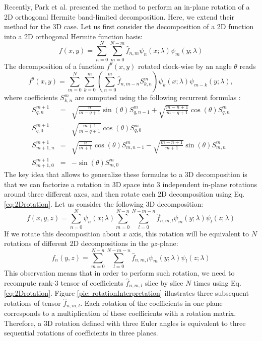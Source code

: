 Recently, Park et al. \cite{Park2010} presented the method to perform
an in-plane rotation of a 2D orthogonal Hermite band-limited decomposition.
Here, we extend their method for the 3D case. Let us first consider
the decomposition of a 2D function into a 2D orthogonal Hermite function
basis:
%
\begin{equation}
f(x,y)=\sum_{n=0}^{N}\sum_{m=0}^{N-m}\hat{f}_{n,m}\psi_{n}(x;\lambda)\psi_{m}(y;\lambda)
\end{equation}
The decomposition of a function $f^{\theta}(x,y)$ rotated clock-wise by an angle
$\theta$ reads
%
\begin{equation}
f^{\theta}(x,y)=\sum_{m=0}^{N}\sum_{k=0}^{m}(\sum_{n=0}^{m}\hat{f}_{n,m-n}S_{k,n}^{m})\psi_{k}(x;\lambda)\psi_{m-k}(y;\lambda),\label{eq:2Drotation}
\end{equation}
where coefficients $S_{k,n}^{m}$ are computed using the following
recurrent formulas \cite{Park2010}:
%
\begin{eqnarray}
S_{q,n}^{m+1} &=&  \sqrt{\frac{n}{m-q+1}}\sin(\theta)S_{q,n-1}^{m}+  \sqrt{\frac{m-n+1}{m-q+1}}\cos(\theta)S_{q,n}^{m}\nonumber \\
S_{q,0}^{m+1}  &=&  \sqrt{\frac{m+1}{m-q+1}}\cos(\theta)S_{q,0}^{m}\nonumber \\
S_{m+1,n}^{m+1}  &=&  \sqrt{\frac{n}{m+1}}\cos(\theta)S_{m,n-1}^{m}-  \sqrt{\frac{m-n+1}{m+1}}\sin(\theta)S_{m,n}^{m}\nonumber \\
S_{m+1,0}^{m+1}  &=&  -\sin(\theta)S_{m,0}^{m}
\end{eqnarray}
%
The key idea that allows to generalize these formulas to a 3D decomposition
is that we can factorize a rotation in 3D space into 3 independent
in-plane rotations around three different axes, and then rotate each
2D decomposition using Eq. \ref{eq:2Drotation}. Let us consider the
following 3D decomposition:
%
\begin{equation}
f(x,y,z)=\sum_{n=0}^{N}\psi_{n}(x;\lambda)\sum_{m=0}^{N-n}\sum_{l=0}^{N-m-n}\hat{f}_{n,m,l}\psi_{m}(y;\lambda)\psi_{l}(z;\lambda)
\end{equation}
If we rotate this decomposition about $x$ axis, this rotation will
be equivalent to  $N$ rotations of different 2D decompositions
in the $yz$-plane:
%
\begin{equation}
f_{n}(y,z)=\sum_{m=0}^{N-n}\sum_{l=0}^{N-m-n}\hat{f}_{n,m,l}\psi_{m}(y;\lambda)\psi_{l}(z;\lambda)
\end{equation}
This observation means that in order to perform such rotation, we
need to recompute rank-3 tensor of coefficients $\hat{f}_{n,m,l}$ slice
by slice $N$ times using Eq. \ref{eq:2Drotation}. Figure \ref{pic: rotationInterpretation}
illustrates three subsequent rotations of  tensor
$\hat{f}_{n,m,l}$. Each rotation of the coefficients in one plane
corresponds to a multiplication of these coefficients with a rotation
matrix. Therefore, a 3D rotation defined with three Euler angles is equivalent
to three sequential rotations of coefficients in three planes.

